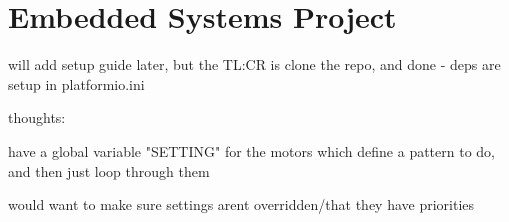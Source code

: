 \chapter{Embedded Systems Project }
\hypertarget{md_README}{}\label{md_README}
\label{md_README_autotoc_md2}%
%


will add setup guide later, but the TL\+:CR is clone the repo, and done -\/ deps are setup in {\ttfamily platformio.\+ini}

thoughts\+:

have a global variable "{}\+SETTING"{} for the motors which define a pattern to do, and then just loop through them

would want to make sure settings aren\textquotesingle{}t overridden/that they have priorities 